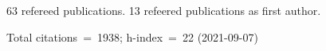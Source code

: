 63 refereed publications. 13 refeered publications as first author.

Total citations~=~1938; h-index~=~22 (2021-09-07)